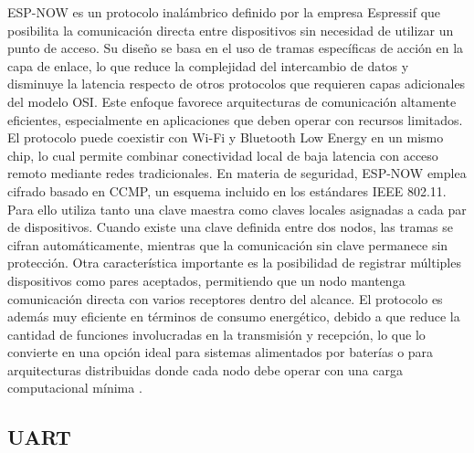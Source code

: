 ESP-NOW es un protocolo inalámbrico definido por la empresa Espressif que posibilita la comunicación directa entre dispositivos sin necesidad de utilizar un punto de acceso. Su diseño se basa en el uso de tramas específicas de acción en la capa de enlace, lo que reduce la complejidad del intercambio de datos y disminuye la latencia respecto de otros protocolos que requieren capas adicionales del modelo OSI.
Este enfoque favorece arquitecturas de comunicación altamente eficientes, especialmente en aplicaciones que deben operar con recursos limitados. El protocolo puede coexistir con Wi-Fi y Bluetooth Low Energy en un mismo chip, lo cual permite combinar conectividad local de baja latencia con acceso remoto mediante redes tradicionales.
En materia de seguridad, ESP-NOW emplea cifrado basado en CCMP, un esquema incluido en los estándares IEEE 802.11. Para ello utiliza tanto una clave maestra como claves locales asignadas a cada par de dispositivos. Cuando existe una clave definida entre dos nodos, las tramas se cifran automáticamente, mientras que la comunicación sin clave permanece sin protección.
Otra característica importante es la posibilidad de registrar múltiples dispositivos como pares aceptados, permitiendo que un nodo mantenga comunicación directa con varios receptores dentro del alcance. El protocolo es además muy eficiente en términos de consumo energético, debido a que reduce la cantidad de funciones involucradas en la transmisión y recepción, lo que lo convierte en una opción ideal para sistemas alimentados por baterías o para arquitecturas distribuidas donde cada nodo debe operar con una carga computacional mínima \cite{espnowEspressif}.



\subsection{UART}

